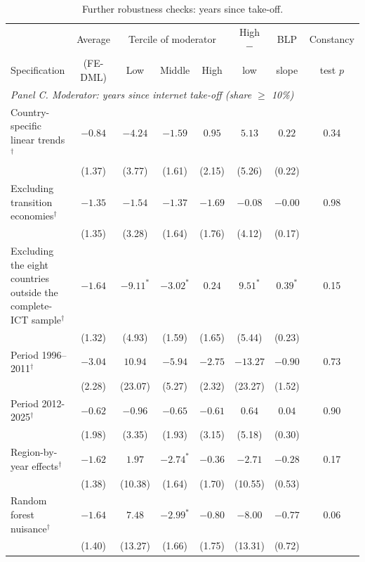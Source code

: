 \documentclass[preprint,12pt,authoryear]{elsarticle}
\begin{document}
\begin{table}[!p]
\centering
\begin{threeparttable}
\caption{Further robustness checks: years since take-off.}\label{tab:empappc}
\scriptsize
\setlength{\tabcolsep}{3pt}
\begin{tabular}{lccccccc}
\toprule
 & Average & \multicolumn{3}{c}{Tercile of moderator} & High $-$ & BLP & Constancy\\
\cmidrule(lr){3-5}
Specification & (FE-DML) & Low & Middle & High & low & slope & test $p$\\
\midrule
\multicolumn{8}{l}{\textit{Panel C. Moderator: years since internet take-off (share $\geq$ 10\%)}}\\
\quad Country-specific linear trends$^{\dagger}$ & $-0.84$ & $-4.24$ & $-1.59$ & $0.95$ & $5.13$ & $0.22$ & 0.34\\
 & (1.37) & (3.77) & (1.61) & (2.15) & (5.26) & (0.22) & \\
\quad Excluding transition economies$^{\dagger}$ & $-1.35$ & $-1.54$ & $-1.37$ & $-1.69$ & $-0.08$ & $-0.00$ & 0.98\\
 & (1.35) & (3.28) & (1.64) & (1.76) & (4.12) & (0.17) & \\
\quad Excluding the eight countries outside the complete-ICT sample$^{\dagger}$ & $-1.64$ & $-9.11^{*}$ & $-3.02^{*}$ & $0.24$ & $9.51^{*}$ & $0.39^{*}$ & 0.15\\
 & (1.32) & (4.93) & (1.59) & (1.65) & (5.44) & (0.23) & \\
\quad Period 1996--2011$^{\dagger}$ & $-3.04$ & $10.94$ & $-5.94$ & $-2.75$ & $-13.27$ & $-0.90$ & 0.73\\
 & (2.28) & (23.07) & (5.27) & (2.32) & (23.27) & (1.52) & \\
\quad Period 2012-2025$^{\dagger}$ & $-0.62$ & $-0.96$ & $-0.65$ & $-0.61$ & $0.64$ & $0.04$ & 0.90\\
 & (1.98) & (3.35) & (1.93) & (3.15) & (5.18) & (0.30) & \\
\quad Region-by-year effects$^{\dagger}$ & $-1.62$ & $1.97$ & $-2.74^{*}$ & $-0.36$ & $-2.71$ & $-0.28$ & 0.17\\
 & (1.38) & (10.38) & (1.64) & (1.70) & (10.55) & (0.53) & \\
\quad Random forest nuisance$^{\dagger}$ & $-1.64$ & $7.48$ & $-2.99^{*}$ & $-0.80$ & $-8.00$ & $-0.77$ & 0.06\\
 & (1.40) & (13.27) & (1.66) & (1.75) & (13.31) & (0.72) & \\

\end{tabular}
\end{threeparttable}
\end{table}
\end{document}
